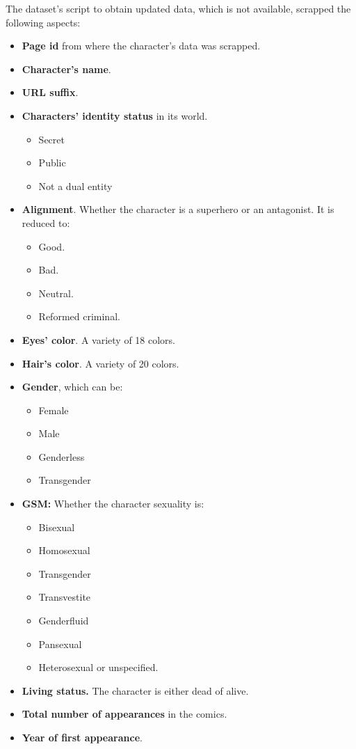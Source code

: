The dataset's script  to obtain updated data, which is not available, scrapped the following aspects:
\begin{itemize}
  \item \textbf{Page id} from where the character's data was scrapped.
  \item \textbf{Character's name}.
  \item \textbf{URL suffix}.
  \item \textbf{Characters' identity status} in its world.
    \begin{itemize}
      \item Secret
      \item Public
      \item Not a dual entity
    \end{itemize}
  \item \textbf{Alignment}. Whether the character is a superhero or an antagonist. It is reduced to:
    \begin{itemize}
      \item Good.
      \item Bad.
      \item Neutral.
      \item Reformed criminal.
    \end{itemize}
  \item \textbf{Eyes' color}. A variety of 18 colors.
  \item \textbf{Hair's color}. A variety of 20 colors.
  \item \textbf{Gender}, which can be:
    \begin{itemize}
      \item Female
      \item Male
      \item Genderless
      \item Transgender
    \end{itemize}
  \item \textbf{GSM:} Whether the character sexuality is:
  \begin{itemize}
    \item Bisexual
    \item Homosexual
    \item Transgender
    \item Transvestite
    \item Genderfluid
    \item Pansexual
    \item Heterosexual or unspecified.
  \end{itemize}
  \item \textbf{Living status.} The character is either dead of alive.
  \item \textbf{Total number of appearances} in the comics.
  \item \textbf{Year of first appearance}.
\end{itemize}

